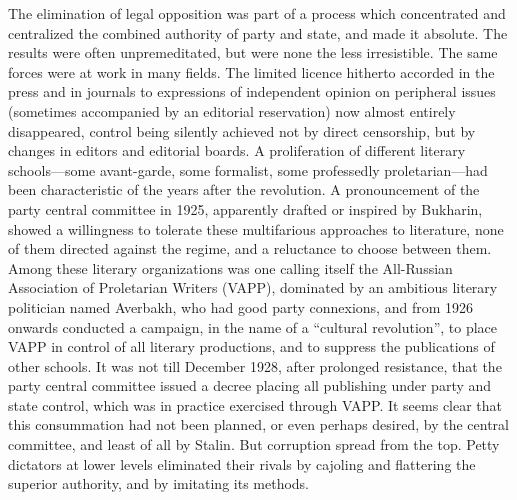 The elimination of legal opposition was part of a process which concentrated and centralized the combined authority of party and state, and made it absolute. The results were often unpremeditated, but were none the less irresistible. The same forces were at work in many fields. The limited licence hitherto accorded in the press and in journals to expressions of independent opinion on peripheral issues (sometimes accompanied by an editorial reservation) now almost entirely disappeared, control being silently achieved not by direct censorship, but by changes in editors and editorial boards. A proliferation of different literary schools---some avant-garde, some formalist, some professedly proletarian---had been characteristic of the years after the revolution. A pronouncement of the party central committee in 1925, apparently drafted or inspired by Bukharin, showed a willingness to tolerate these multifarious approaches to literature, none of them directed against the regime, and a reluctance to choose between them. Among these literary organizations was one calling itself the All-Russian Association of Proletarian Writers (VAPP), dominated by an ambitious literary politician named Averbakh, who had good party connexions, and from 1926 onwards conducted a campaign, in the name of a ``cultural revolution'', to place VAPP in control of all literary productions, and to suppress the publications of other schools. It was not till December 1928, after prolonged resistance, that the party central committee issued a decree placing all publishing under party and state control, which was in practice exercised through VAPP. It seems clear that this consummation had not been planned, or even perhaps desired, by the central committee, and least of all by Stalin. But corruption spread from the top. Petty dictators at lower levels eliminated their rivals by cajoling and flattering the superior authority, and by imitating its methods. 

